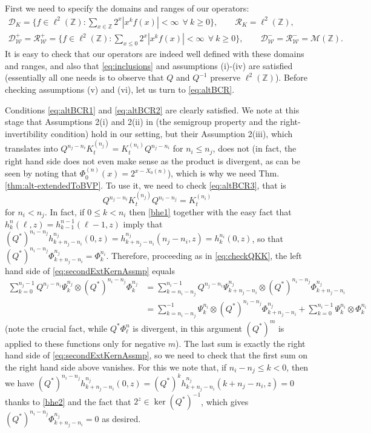 \documentclass[letterpaper,reqno,11pt,oneside,final]{amsart}
\theoremstyle{definition}
\newcommand{\Qt}{Q^*}
\newcommand{\zz}{\mathbb{Z}}
\newcommand{\cD}{\mathcal{D}}
\newcommand{\cR}{\mathcal{R}}
\newcommand{\cm}{\mathcal{M}}
\newcommand{\cw}{\mathcal{W}}
\numberwithin{equation}{section}
\begin{document}
First we need to specify the domains and ranges of our operators:
\begin{gather}
\cD_K=\{f\in\ell^2(\zz)\!:\sum_{x\in\zz}2^x|x^kf(x)|<\infty~~\forall~k\geq0\},\qquad\cR_K=\ell^2(\zz),\\
\cD_\cw^+=\cR_\cw^+=\{f\in\ell^2(\zz)\!:\sum_{x\leq0}2^x|x^kf(x)|<\infty~~\forall~k\geq0\},
\qquad\cD_\cw^-=\cR_\cw^-=\cm(\zz).
\end{gather}
It is easy to check that our operators are indeed well defined with these domains and ranges, and also that \eqref{eq:inclusions} and assumptions (i)-(iv) are satisfied (essentially all one needs is to observe that $Q$ and $Q^{-1}$ preserve $\ell^2(\zz)$).
Before checking assumptions (v) and (vi), let us turn to \eqref{eq:altBCR}.

Conditions \eqref{eq:altBCR1} and \eqref{eq:altBCR2} are clearly satisfied.
We note at this stage that Assumptions 2(i) and 2(ii) in \cite[Thm. 3.3]{bcr} (the semigroup property and the right-invertibility condition) hold in our setting, but their Assumption 2(iii), which translates into $Q^{n_j-n_i}K_t^{(n_j)}=K_t^{(n_i)}Q^{n_j-n_i}$ for $n_i\leq n_j$, does not (in fact, the right hand side does not even make sense as the product is divergent, as can be seen by noting that $\Phi^{(n)}_0(x)=2^{x-X_0(n)}$),
which is why we need Thm.\,\ref{thm:alt-extendedToBVP}.
To use it, we need to check \eqref{eq:altBCR3}, that is
\begin{equation}
  Q^{n_j-n_i}K_t^{(n_j)}Q^{n_i-n_j}=K_t^{(n_i)}\label{eq:secondExtKernAssmp}
\end{equation}
for $n_i<n_j$.
In fact, if $0\leq k<n_i$ then \eqref{bhe1} together with the easy fact that $h^n_k(\ell,z)=h^{n-1}_{k-1}(\ell-1,z)$ imply that $(\Qt)^{n_i-n_j}h^{n_j}_{k+n_j-n_i}(0,z)=h^{n_j}_{k+n_j-n_i}(n_j-n_i,z)=h^{n_i}_{k}(0,z)$, so that
$(\Qt)^{n_i-n_j}\Phi^{n_j}_{k+n_j-n_i}=\Phi^{n_i}_k$.
Therefore, proceeding as in \eqref{eq:checkQKK}, the left hand side of \eqref{eq:secondExtKernAssmp} equals
\begin{equation}\label{eq:extKernAssumCheck}
 \begin{split}
  \sum_{k=0}^{n_j-1}Q^{n_j-n_i}\Psi^{n_j}_{k}\otimes(\Qt)^{n_i-n_j}\Phi^{n_j}_{k}
   &=\sum_{k=n_i-n_j}^{n_i-1}Q^{n_j-n_i}\Psi^{n_j}_{k+n_j-n_i}\otimes(\Qt)^{n_i-n_j}\Phi^{n_j}_{k+n_j-n_i}\\
  &=\sum_{k=n_i-n_j}^{-1}\Psi^{n_i}_{k}\otimes(\Qt)^{n_i-n_j}\Phi^{n_j}_{k+n_j-n_i}
  +\sum_{k=0}^{n_i-1}\Psi^{n_i}_{k}\otimes\Phi^{n_i}_{k}
 \end{split}
\end{equation}
(note the crucial fact, while $\Qt\Phi^n_\ell$ is divergent, in this argument $(\Qt)^m$ is applied to these functions only for negative $m$).
The last sum is exactly the right hand side of \eqref{eq:secondExtKernAssmp}, so we need to check that the first sum on the right hand side above vanishes.
For this we note that, if $n_i-n_j\leq k<0$, then we have 
$(\Qt)^{n_i-n_j}h^{n_j}_{k+n_j-n_i}(0,z)=(\Qt)^kh^{n_j}_{k+n_j-n_i}(k+n_j-n_i,z)=0$ thanks to \eqref{bhe2} and the fact that $2^z\in\ker(\Qt)^{-1}$, which gives $(\Qt)^{n_i-n_j}\Phi^{n_j}_{k+n_j-n_i}=0$ as desired.
\end{document}
